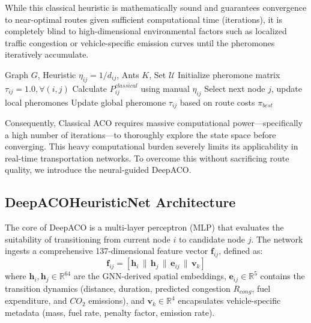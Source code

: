 \documentclass[conference]{IEEEtran}
\begin{document}
While this classical heuristic is mathematically sound and guarantees convergence to near-optimal routes given sufficient computational time (iterations), it is completely blind to high-dimensional environmental factors such as localized traffic congestion or vehicle-specific emission curves until the pheromones iteratively accumulate. 

\begin{algorithm}
\caption{Classical ACO Routing Algorithm}
\label{alg:classical_aco}
\begin{algorithmic}[1]
\REQUIRE Graph $G$, Heuristic $\eta_{ij} = 1/d_{ij}$, Ants $K$, Set $\mathcal{U}$
\STATE Initialize pheromone matrix $\tau_{ij} = 1.0, \forall (i,j)$
            \STATE Calculate $P_{ij}^{classical}$ using manual $\eta_{ij}$
            \STATE Select next node $j$, update local pheromones
        \ENDWHILE
    \ENDFOR
    \STATE Update global pheromone $\tau_{ij}$ based on route costs
\ENDFOR
\RETURN $\pi_{best}$
\end{algorithmic}
\end{algorithm}

Consequently, Classical ACO requires massive computational power—specifically a high number of iterations—to thoroughly explore the state space before converging. This heavy computational burden severely limits its applicability in real-time transportation networks. To overcome this without sacrificing route quality, we introduce the neural-guided DeepACO.

\subsection{DeepACOHeuristicNet Architecture}
The core of DeepACO is a multi-layer perceptron (MLP) that evaluates the suitability of transitioning from current node $i$ to candidate node $j$. The network ingests a comprehensive 137-dimensional feature vector $\mathbf{f}_{ij}$, defined as:
\begin{equation}
    \mathbf{f}_{ij} = \left[ \mathbf{h}_i \,\|\, \mathbf{h}_j \,\|\, \mathbf{e}_{ij} \,\|\, \mathbf{v}_k \right]
\end{equation}
where $\mathbf{h}_i, \mathbf{h}_j \in \mathbb{R}^{64}$ are the GNN-derived spatial embeddings, $\mathbf{e}_{ij} \in \mathbb{R}^{5}$ contains the transition dynamics (distance, duration, predicted congestion $R_{cong}$, fuel expenditure, and $CO_2$ emissions), and $\mathbf{v}_k \in \mathbb{R}^{4}$ encapsulates vehicle-specific metadata (mass, fuel rate, penalty factor, emission rate).
\end{document}
